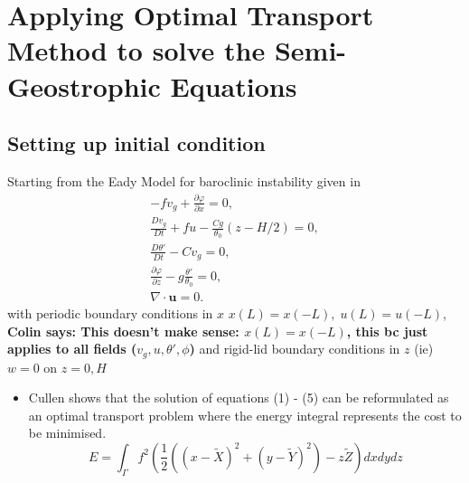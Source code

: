\documentclass[]{article}
\newcommand{\comments}[2]{{\bfseries #1 says: #2}}
\begin{document}
\section{Applying Optimal Transport Method to solve the Semi-Geostrophic Equations}
	\subsection{Setting up initial condition}
	Starting from the Eady Model for baroclinic instability given in \cite{Cullen2008}
	\begin{align}
	-fv_g + \frac{\partial \varphi}{\partial x} = 0,\\
	\frac{Dv_g}{Dt} + fu -\frac{Cg}{\theta _0}\left(z-H/2\right) = 0,\\
	\frac{D\theta'}{Dt} - Cv_g = 0,\\
	\frac{\partial \varphi}{\partial z} - g\frac{\theta'}{\theta_0} = 0,\\
	\nabla \cdot \bm{u} = 0.
	\end{align}
	with periodic boundary conditions in $x$ \color{red} $x(L) = x(-L), \; u(L) = u(-L)$, \color{black} \comments{Colin}{This doesn't make sense: $x(L)=x(-L)$, this bc just applies to all fields ($v_g,u,\theta',\phi$)}
        and rigid-lid boundary conditions in $z$ (ie) $w = 0$ on $z = 0, H$
	\begin{itemize}
		\item Cullen \cite{Cullen2008} shows that the solution of equations (1) - (5) can be reformulated as an optimal transport problem where the energy integral represents the cost to be minimised.
		\begin{equation}
		E = \int_ \Gamma f^2 \left(\frac{1}{2}\left(\left(x - \tilde{X}\right)^2 +\left(y - \tilde{Y}\right)^2\right) - z\tilde{Z}\right)dxdydz
		\end{equation}
	\end{itemize}
\end{document}
